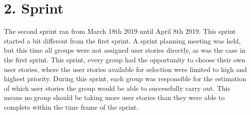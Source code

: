 \chapter{2. Sprint}
The second sprint ran from March 18th 2019 until April 8th 2019.
This sprint started a bit different from the first sprint. A sprint planning meeting was held, but this time all groups were not assigned user stories directly, as was the case in the first sprint. This sprint, every group had the opportunity to choose their own user stories, where the user stories available for selection were limited to high and highest priority. During this sprint, each group was responsible for the estimation of which user stories the group would be able to successfully carry out. This means no group should be taking more user stories than they were able to complete within the time frame of the sprint.



